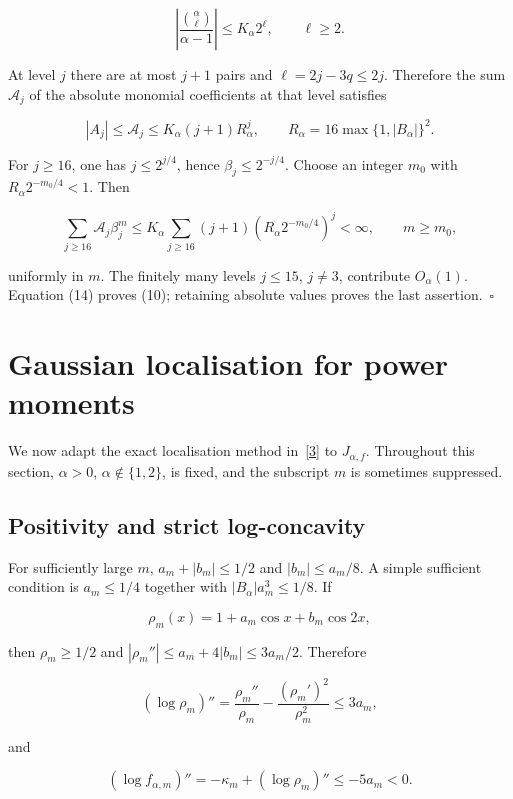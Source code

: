 \documentclass[
  11pt,
]{article}
\begin{document}
\[
\left|\frac{\binom\alpha\ell}{\alpha-1}\right|
 \leq K_\alpha2^\ell,\qquad \ell\geq2.
\]

At level \(j\) there are at most \(j+1\) pairs and \(\ell=2j-3q\leq2j\).
Therefore the sum \(\mathcal A_j\) of the absolute monomial coefficients
at that level satisfies

\[
\tag{15}
 |A_j|\leq\mathcal A_j\leq
 K_\alpha(j+1)R_\alpha^j,
 \qquad R_\alpha=16\max\{1,|B_\alpha|\}^2.
\]

For \(j\geq16\), one has \(j\leq2^{j/4}\), hence
\(\beta_j\leq2^{-j/4}\). Choose an integer \(m_0\) with
\(R_\alpha2^{-m_0/4}<1\). Then

\[
\sum_{j\geq16}\mathcal A_j\beta_j^m
 \leq K_\alpha\sum_{j\geq16}(j+1)
       (R_\alpha2^{-m_0/4})^j<\infty,
 \qquad m\geq m_0,
\]

uniformly in \(m\). The finitely many levels \(j\leq15\), \(j\ne3\),
contribute \(O_\alpha(1)\). Equation (14) proves (10); retaining
absolute values proves the last assertion.~\(\square\)

\section{Gaussian localisation for power
moments}\label{gaussian-localisation-for-power-moments}

We now adapt the exact localisation method
in~\href{https://arxiv.org/abs/2608.30275v1}{{[}3{]}} to
\(J_{\alpha,f}\). Throughout this section, \(\alpha>0\),
\(\alpha\notin\{1,2\}\), is fixed, and the subscript \(m\) is sometimes
suppressed.

\subsection{Positivity and strict
log-concavity}\label{positivity-and-strict-log-concavity}

For sufficiently large \(m\), \(a_m+|b_m|\leq1/2\) and
\(|b_m|\leq a_m/8\). A simple sufficient condition is \(a_m\leq1/4\)
together with \(|B_\alpha|a_m^3\leq1/8\). If

\[
\rho_m(x)=1+a_m\cos x+b_m\cos2x,
\]

then \(\rho_m\geq1/2\) and \(|\rho_m''|\leq a_m+4|b_m|\leq3a_m/2\).
Therefore

\[
(\log\rho_m)''=\frac{\rho_m''}{\rho_m}
   -\frac{(\rho_m')^2}{\rho_m^2}\leq3a_m,
\]

and

\[
\tag{16}
 (\log f_{\alpha,m})''=-\kappa_m+(\log\rho_m)''
 \leq-5a_m<0.
\]
\end{document}
